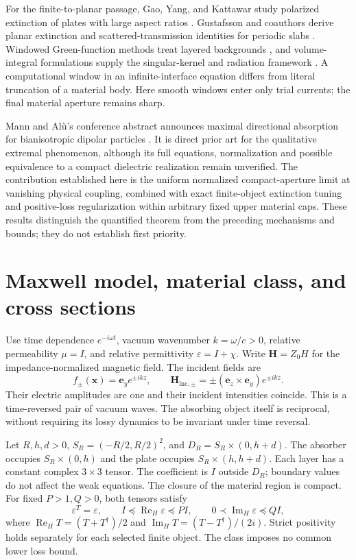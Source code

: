 \documentclass[11pt]{article}
\newcommand{\ReH}{\operatorname{Re}_{\!H}}
\newcommand{\ImH}{\operatorname{Im}_{\!H}}
\newcommand{\ey}{\mathbf e_y}
\newcommand{\ez}{\mathbf e_z}
\begin{document}
For the finite-to-planar passage, Gao, Yang, and Kattawar study polarized extinction of plates with large aspect ratios \citep{Gao2013}. Gustafsson and coauthors derive planar extinction and scattered-transmission identities for periodic slabs \citep{Gustafsson2012}. Windowed Green-function methods treat layered backgrounds \citep{Bruno2016,Arrieta2022}, and volume-integral formulations supply the singular-kernel and radiation framework \citep{YurkinMishchenko2018,MishchenkoYurkin2018}. A computational window in an infinite-interface equation differs from literal truncation of a material body. Here smooth windows enter only trial currents; the final material aperture remains sharp.

Mann and Al\`u's conference abstract announces maximal directional absorption for bianisotropic dipolar particles \citep{MannAlu2023}. It is direct prior art for the qualitative extremal phenomenon, although its full equations, normalization and possible equivalence to a compact dielectric realization remain unverified. The contribution established here is the uniform normalized compact-aperture limit at vanishing physical coupling, combined with exact finite-object extinction tuning and positive-loss regularization within arbitrary fixed upper material caps. These results distinguish the quantified theorem from the preceding mechanisms and bounds; they do not establish first priority.

\section{Maxwell model, material class, and cross sections}\label{sec:model}
Use time dependence $e^{-i\omega t}$, vacuum wavenumber $k=\omega/c>0$, relative permeability $\mu=I$, and relative permittivity $\varepsilon=I+\chi$. Write $\mathbf H=Z_0H$ for the impedance-normalized magnetic field. The incident fields are
\begin{equation}\label{eq:incident}
 f_\pm(\mathbf x)=\ey e^{\pm ikz},\qquad
 \mathbf H_{\mathrm{inc},\pm}=\pm(\ez\times\ey)e^{\pm ikz}.
\end{equation}
Their electric amplitudes are one and their incident intensities coincide. This is a time-reversed pair of vacuum waves. The absorbing object itself is reciprocal, without requiring its lossy dynamics to be invariant under time reversal.

Let $R,h,d>0$, $S_R=(-R/2,R/2)^2$, and $D_R=S_R\times(0,h+d)$. The absorber occupies $S_R\times(0,h)$ and the plate occupies $S_R\times(h,h+d)$. Each layer has a constant complex $3\times3$ tensor. The coefficient is $I$ outside $D_R$; boundary values do not affect the weak equations. The closure of the material region is compact. For fixed $P>1,Q>0$, both tensors satisfy
\begin{equation}\label{eq:material}
 \varepsilon^T=\varepsilon,\qquad
 I\preceq\ReH\varepsilon\preceq PI,\qquad
 0\prec\ImH\varepsilon\preceq QI,
\end{equation}
where $\ReH T=(T+T^\dagger)/2$ and $\ImH T=(T-T^\dagger)/(2i)$. Strict positivity holds separately for each selected finite object. The class imposes no common lower loss bound.
\end{document}
